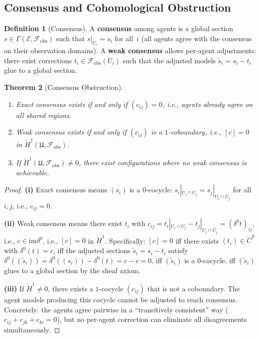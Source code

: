 \documentclass[11pt,a4paper]{article}
\theoremstyle{plain}
\newtheorem{theorem}{Theorem}[section]
\theoremstyle{definition}
\newtheorem{definition}[theorem]{Definition}
\theoremstyle{remark}
\newcommand{\cF}{\mathcal{F}}
\newcommand{\cE}{\mathcal{E}}
\newcommand{\fU}{\mathfrak{U}}
\newcommand{\im}{\mathrm{im}}
\newcommand{\Cech}{\check{C}}
\newcommand{\CechH}{\check{H}}
\begin{document}
\subsection{Consensus and Cohomological Obstruction}

\begin{definition}[Consensus]\label{def:consensus}
A \textbf{consensus} among agents is a global section $s \in \Gamma(\cE, \cF_{\mathrm{obs}})$ such that $s|_{U_i} = s_i$ for all~$i$ (all agents agree with the consensus on their observation domains). A \textbf{weak consensus} allows per-agent adjustments: there exist corrections $t_i \in \cF_{\mathrm{obs}}(U_i)$ such that the adjusted models $\tilde{s}_i = s_i - t_i$ glue to a global section.
\end{definition}

\begin{theorem}[Consensus Obstruction]\label{thm:consensus}
\begin{enumerate}[label=(\roman*)]
\item Exact consensus exists if and only if $(c_{ij}) = 0$, i.e., agents already agree on all shared regions.
\item Weak consensus exists if and only if $(c_{ij})$ is a $1$-coboundary, i.e., $[c] = 0$ in $\CechH^1(\fU, \cF_{\mathrm{obs}})$.
\item If $\CechH^1(\fU, \cF_{\mathrm{obs}}) \neq 0$, there exist configurations where no weak consensus is achievable.
\end{enumerate}
\end{theorem}

\begin{proof}
\textbf{(i)} Exact consensus means $(s_i)$ is a $0$-cocycle: $s_i|_{U_i \cap U_j} = s_j|_{U_i \cap U_j}$ for all~$i,j$, i.e., $c_{ij} = 0$.

\textbf{(ii)} Weak consensus means there exist $t_i$ with $c_{ij} = t_i|_{U_i \cap U_j} - t_j|_{U_i \cap U_j} = (\delta^0 t)_{ij}$, i.e., $c \in \im \delta^0$, i.e., $[c] = 0$ in $\CechH^1$. Specifically: $[c] = 0$ iff there exists $(t_i) \in \Cech^0$ with $\delta^0(t) = c$, iff the adjusted sections $\tilde{s}_i = s_i - t_i$ satisfy $\delta^0((\tilde{s}_i)) = \delta^0((s_i)) - \delta^0(t) = c - c = 0$, iff $(\tilde{s}_i)$ is a $0$-cocycle, iff $(\tilde{s}_i)$ glues to a global section by the sheaf axiom.

\textbf{(iii)} If $\CechH^1 \neq 0$, there exists a $1$-cocycle $(c_{ij})$ that is not a coboundary. The agent models producing this cocycle cannot be adjusted to reach consensus. Concretely: the agents agree pairwise in a ``transitively consistent'' way ($c_{ij} + c_{jk} + c_{ki} = 0$), but no per-agent correction can eliminate all disagreements simultaneously.
\end{proof}
\end{document}

